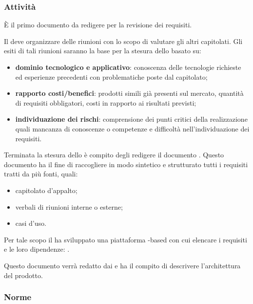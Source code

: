 \documentclass[a4paper, titlepage]{article}
\begin{document}
\subsubsection{Attività}

È il primo documento da redigere per la revisione dei requisiti.

Il  deve organizzare delle riunioni con lo scopo di valutare gli altri capitolati. Gli esiti di tali riunioni saranno la base per la stesura dello  basato su:
\begin{itemize}
	\item \textbf{dominio tecnologico e applicativo}: conoscenza delle tecnologie richieste ed esperienze precedenti con problematiche poste dal capitolato;
	\item \textbf{rapporto costi/benefici}: prodotti simili già presenti sul mercato, quantità di requisiti obbligatori, costi in rapporto ai risultati previsti;
	\item \textbf{individuazione dei rischi}: comprensione dei punti critici della realizzazione quali mancanza di conoscenze o competenze e difficoltà nell'individuazione dei requisiti.
\end{itemize}

Terminata la stesura dello  è compito degli  redigere il documento . Questo documento ha il fine di raccogliere in modo sintetico e strutturato tutti i requisiti tratti da più fonti, quali: 
\begin{itemize}
	\item capitolato d'appalto;
	\item verbali di riunioni interne o esterne;
	\item casi d'uso.
\end{itemize}

Per tale scopo il  ha sviluppato una piattaforma -based con cui elencare i requisiti e le loro dipendenze: .

Questo documento verrà redatto dai  e ha il compito di descrivere l'architettura del prodotto.

\subsubsection{Norme}
\end{document}
